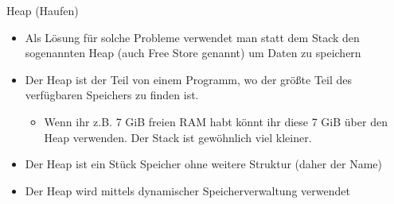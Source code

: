 \documentclass[presentation]{beamer}
\begin{document}
\begin{frame}[label={sec:org06c091e}]{Heap (Haufen)}
\begin{itemize}
\item Als Lösung für solche Probleme verwendet man statt dem Stack den
sogenannten \alert{Heap} (auch \alert{Free Store} genannt) um Daten zu speichern
\item Der Heap ist der Teil von einem Programm, wo der größte Teil des
verfügbaren Speichers zu finden ist.
\begin{itemize}
\item Wenn ihr z.B. 7 GiB freien RAM habt könnt ihr diese 7 GiB über den
Heap verwenden. Der Stack ist gewöhnlich viel kleiner.
\end{itemize}
\item Der Heap ist ein Stück Speicher ohne weitere Struktur (daher der
Name)
\item Der Heap wird mittels \alert{dynamischer Speicherverwaltung} verwendet
\end{itemize}
\end{frame}
\end{document}
